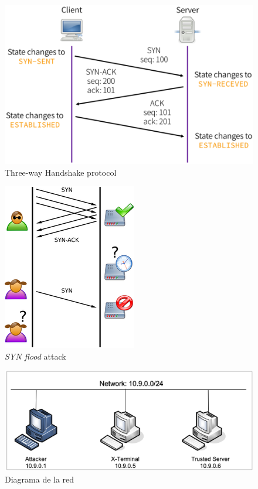 \documentclass{article}
\begin{document}
\begin{figure}[htpb!]
    \centering
    \includegraphics[scale=0.5]{images/threeway_handshake.png}
    \caption{Three-way Handshake protocol}
    \label{fig:threewayhandshake}
\end{figure}

\begin{figure}[htpb!]
    \centering
    \includegraphics[scale=2]{images/Tcp_synflood.png}
    \caption{\textit{SYN flood} attack}
    \label{fig:TCP-SYN-flood}
\end{figure}

\begin{figure}[htpb!]
    \centering
    \includegraphics[scale=0.6]{images/diagramaRed.png}
    \caption{Diagrama de la red}
    \label{fig:diagramaRed}
\end{figure}
\end{document}
